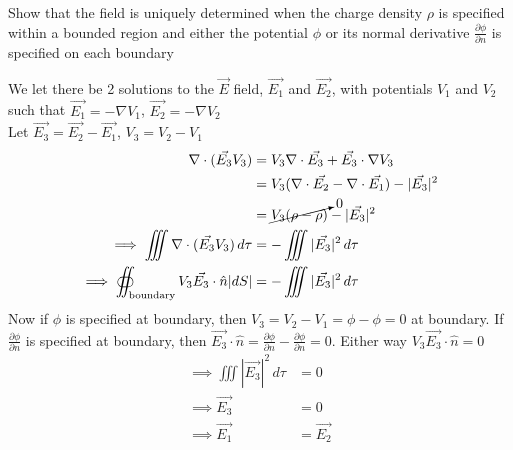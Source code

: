 \documentclass[../main.tex]{subfiles}
\begin{document}
\begin{questions}

\question Show that the field is uniquely determined when the charge density $\rho$ is specified within a bounded region and either the potential $\phi$ or its normal derivative $\frac{\partial \phi}{\partial n}$ is specified on each boundary
\begin{solution}
	We let there be 2 solutions to the $\vec{E}$ field, $\vec{E_1}$ and $\vec{E_2}$, with potentials $V_1$ and $V_2$ such that $\vec{E_1}=-\nabla V_1$, $\vec{E_2}=-\nabla V_2$\\
	Let $\vec{E_3}=\vec{E_2}-\vec{E_1}$, $V_3=V_2-V_1$
	\begin{align}
		\nabla\cdot(\vec{E_3}V_3) &= V_3\nabla\cdot\vec{E_3} + \vec{E_3}\cdot\nabla V_3\\
		&= V_3 (\nabla\cdot\vec{E_2}-\nabla\cdot\vec{E_1}) - |\vec{E_3}|^2\\
		&= \cancelto{0}{V_3 (\rho-\rho)} - |\vec{E_3}|^2\\
		\implies \iiint \nabla\cdot(\vec{E_3}V_3)\,d\tau &= -\iiint |\vec{E_3}|^2\,d\tau\\
		\implies \oiint_\text{boundary} V_3\vec{E_3}\cdot\hat{n}|dS| &= -\iiint |\vec{E_3}|^2\,d\tau
	\end{align}
	Now if $\phi$ is specified at boundary, then $V_3 = V_2-V_1 = \phi-\phi=0$ at boundary. If $\frac{\partial\phi}{\partial n}$ is specified at boundary, then $\vec{E_3}\cdot\hat{n} = \frac{\partial\phi}{\partial n}-\frac{\partial\phi}{\partial n}=0$. Either way $V_3\vec{E_3}\cdot\hat{n}=0$
	\begin{align}
		\implies \iiint |\vec{E_3}|^2\,d\tau &= 0\\
		\implies \vec{E_3} &= 0\\
		\implies \vec{E_1} &= \vec{E_2}
	\end{align}


\end{solution}
\end{questions}
\end{document}
